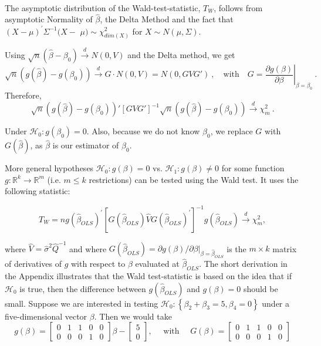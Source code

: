 \begin{definition}\label{Wald Test}
  \ 

  The asymptotic distribution of the Wald-test-statistic, $T_W$,
  follows from asymptotic Normality of $\hat{\beta}$, 
  the Delta Method and the fact that $(X-\mu)^\prime\Sigma^{-1}(X-$ $\mu)\sim\chi_{dim(X)}^2$ for $X\sim N(\mu,\Sigma).$

  Using $\sqrt{n}(\hat{\beta}-\beta_{0})\stackrel{d}{\rightarrow}N(0,V)$ and the Delta method, we get
  $$\sqrt{n}\left(g(\hat{\beta})-g(\beta_0)\right)\overset{d}{\to}G\cdot N(0,V)=N(0,GVG')\:,\quad\mathrm{with}\quad G=\left.\frac{\partial g(\beta)}{\partial\beta}\right|_{\beta=\beta_0}\:.$$
  Therefore,
  $$\sqrt{n}\left(g(\hat{\beta})-g(\beta_0)\right)'[GVG']^{-1}\sqrt{n}\left(g(\hat{\beta})-g(\beta_0)\right)\stackrel{d}{\to}\chi_m^2\:.$$

  Under $\mathcal{H}_0: g(\beta_0)=0.$ Also, because we do not know $\beta_0$, we replace $G$ with $G(\hat{\beta})$, as $\hat{\beta}$ is our
  estimator of $\beta_0.$
\end{definition}

More general hypotheses  $\mathcal{H}_{0}: g(\beta)=0 $ vs.  $\mathcal{H}_{1}: g(\beta) \neq 0$  for some function  $g: \mathbb{R}^{k} \rightarrow \mathbb{R}^{m}$  (i.e. $ m \leq k $ restrictions) can be tested using the Wald test. It uses the following statistic:

$$T_{W}=n g\left(\hat{\beta}_{O L S}\right)^{\prime}\left[G\left(\hat{\beta}_{O L S}\right) \hat{V} G\left(\hat{\beta}_{O L S}\right)^{\prime}\right]^{-1} g\left(\hat{\beta}_{O L S}\right) \xrightarrow{d} \chi_{m}^{2},$$

where $\hat{V}=\hat{\sigma}^{2} \hat{Q}^{-1}$ and where  $G\left(\hat{\beta}_{O L S}\right)=\partial g(\beta) /\left.\partial \beta\right|_{\beta=\hat{\beta}_{O L S}}$  is the $m \times k$ matrix of derivatives of $g$ with respect to $\beta$  evaluated at  $\hat{\beta}_{OLS}$. 
The short derivation in the Appendix illustrates that the Wald test-statistic is based on the idea that if $\mathcal{H}_{0}$  is true, then the difference between  $g\left(\hat{\beta}_{O L S}\right)$ and $g(\beta)=0$ should be small. Suppose we are interested in testing  $\mathcal{H}_{0}:\left\{\beta_{2}+\beta_{3}=5, \beta_{4}=0\right\}$ under a five-dimensional vector $\beta$. 
Then we would take
\[
g(\beta)=\left[\begin{array}{lllll}
0 & 1 & 1 & 0 & 0 \\
0 & 0 & 0 & 1 & 0
\end{array}\right] \beta-\left[\begin{array}{l}
5 \\
0
\end{array}\right], \quad \text { with } \quad G(\beta)=\left[\begin{array}{lllll}
0 & 1 & 1 & 0 & 0 \\
0 & 0 & 0 & 1 & 0
\end{array}\right]
\]

